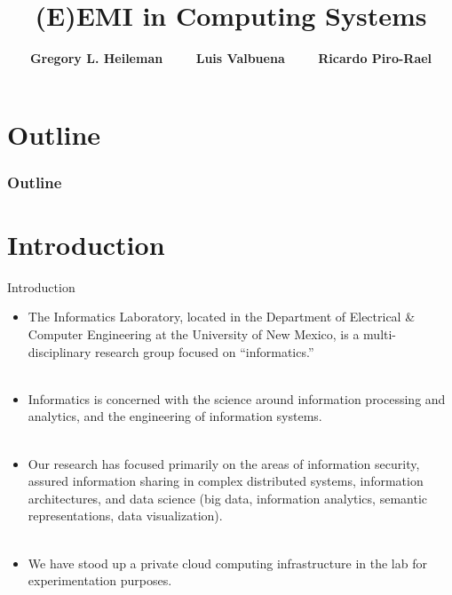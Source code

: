 \documentclass[t,handout]{beamer}   %
\title[]
{(E)EMI in Computing Systems}
\author[Heileman, Valbuena, Piro-Rael] %
{\bf Gregory L. Heileman \ \ \ \ Luis Valbuena \ \ \ \ Ricardo Piro-Rael}
\institute[]
{Informatics Laboratory \\
Department of Electrical \& Computer Engineering \\
University of New Mexico}
\date[June 10, 2015]
\begin{document}
\begin{frame}
  \titlepage
\end{frame}



\section*{Outline}

\begin{frame}  \frametitle{Outline}  
	\tableofcontents
\end{frame}

\section{Introduction}

\begin{frame}{Introduction}
\begin{itemize}
\vspace*{-0.2in}
 \item The Informatics Laboratory, located in the Department of Electrical \& Computer Engineering at the University of New Mexico, is a multi-disciplinary research group focused on ``informatics.''~\\~\\
 \pause
 \item Informatics is concerned with the science around information processing and analytics, and the engineering of information systems.~\\~\\
 \pause
 \item Our research has focused primarily on the areas of information security, assured information sharing in complex distributed systems,  information architectures, and data science (big data, information analytics, semantic representations, data visualization).~\\~\\
 \pause
 \item We have stood up a private cloud computing infrastructure in the lab for experimentation purposes.
 \end{itemize}
\end{frame}
\end{document}
